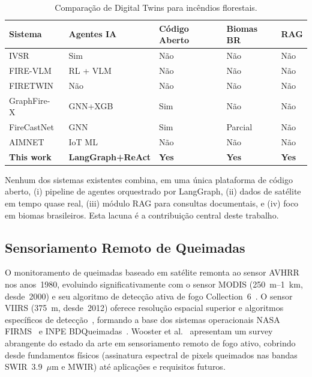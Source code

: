 \documentclass[preprint,times,numbers]{elsarticle}
\begin{document}
\begin{table}[htbp]
\centering
\caption{Comparação de Digital Twins para incêndios florestais.}
\label{tab:dt-comparison}
\small
\begin{tabular}{lp{2.2cm}p{1.8cm}p{1.8cm}p{1.8cm}}
\toprule
\textbf{Sistema} & \textbf{Agentes IA} & \textbf{Código Aberto} & \textbf{Biomas BR} & \textbf{RAG} \\
\midrule
IVSR~\cite{article:morsali2026} & Sim & Não & Não & Não \\
FIRE-VLM~\cite{article:webb2026} & RL + VLM & Não & Não & Não \\
FIRETWIN~\cite{article:raha2025} & Não & Não & Não & Não \\
GraphFire-X~\cite{article:esparza2025} & GNN+XGB & Sim & Não & Não \\
FireCastNet~\cite{article:michail2025} & GNN & Sim & Parcial & Não \\
AIMNET~\cite{article:aimnet2025} & IoT ML & Não & Não & Não \\
\textbf{This work} & \textbf{LangGraph+ReAct} & \textbf{Yes} & \textbf{Yes} & \textbf{Yes} \\
\bottomrule
\end{tabular}
\end{table}

Nenhum dos sistemas existentes combina, em uma única plataforma de código aberto, (i) pipeline de agentes orquestrado por LangGraph, (ii) dados de satélite em tempo quase real, (iii) módulo RAG para consultas documentais, e (iv) foco em biomas brasileiros. Esta lacuna é a contribuição central deste trabalho.

\subsection{Sensoriamento Remoto de Queimadas}

O monitoramento de queimadas baseado em satélite remonta ao sensor AVHRR nos anos~1980, evoluindo significativamente com o sensor MODIS (250~m--1~km, desde~2000) e seu algoritmo de detecção ativa de fogo Collection~6~\cite{article:giglio2016}. O sensor VIIRS (375~m, desde~2012) oferece resolução espacial superior e algoritmos específicos de detecção~\cite{article:schroeder2014}, formando a base dos sistemas operacionais NASA FIRMS~\cite{manual:firms2024} e INPE BDQueimadas~\cite{article:inpe2023}. Wooster et al.~\cite{article:wooster2021} apresentam um survey abrangente do estado da arte em sensoriamento remoto de fogo ativo, cobrindo desde fundamentos físicos (assinatura espectral de pixels queimados nas bandas SWIR~3.9~$\mu$m e MWIR) até aplicações e requisitos futuros.
\end{document}
